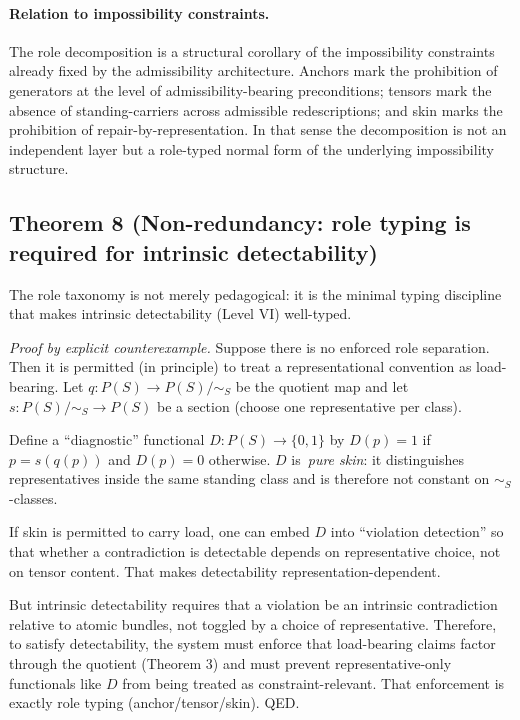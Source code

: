 \documentclass[12pt]{article}
\theoremstyle{plain}
\begin{document}
\paragraph{Relation to impossibility constraints.} The role decomposition is a structural corollary of the impossibility constraints already fixed by the admissibility architecture. Anchors mark the prohibition of generators at the level of admissibility-bearing preconditions; tensors mark the absence of standing-carriers across admissible redescriptions; and skin marks the prohibition of repair-by-representation. In that sense the decomposition is not an independent layer but a role-typed normal form of the underlying impossibility structure.

\subsection{Theorem 8 (Non-redundancy: role typing is required for intrinsic detectability)}

The role taxonomy is not merely pedagogical: it is the minimal typing discipline that makes intrinsic detectability (Level VI) well-typed.

\textit{Proof by explicit counterexample.} Suppose there is no enforced role separation. Then it is permitted (in principle) to treat a representational convention as load-bearing. Let $q:P(S)\to P(S)/\sim_S$ be the quotient map and let $s:P(S)/\sim_S\to P(S)$ be a section (choose one representative per class).

Define a ``diagnostic'' functional $D:P(S)\to\{0,1\}$ by $D(p)=1$ if $p=s(q(p))$ and $D(p)=0$ otherwise. $D$ is \,\emph{pure skin}: it distinguishes representatives inside the same standing class and is therefore not constant on $\sim_S$-classes.

If skin is permitted to carry load, one can embed $D$ into ``violation detection'' so that whether a contradiction is detectable depends on representative choice, not on tensor content. That makes detectability representation-dependent.

But intrinsic detectability requires that a violation be an intrinsic contradiction relative to atomic bundles, not toggled by a choice of representative. Therefore, to satisfy detectability, the system must enforce that load-bearing claims factor through the quotient (Theorem 3) and must prevent representative-only functionals like $D$ from being treated as constraint-relevant. That enforcement is exactly role typing (anchor/tensor/skin). QED.
\end{document}
